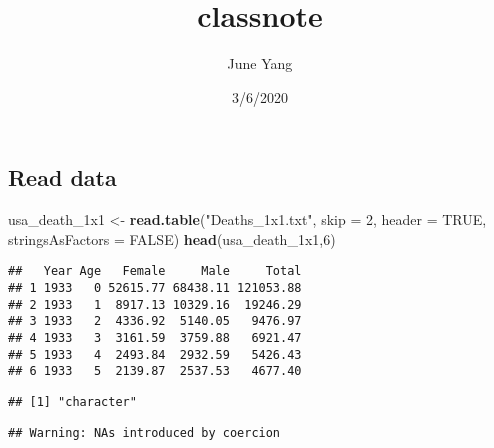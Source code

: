\documentclass[]{article}
\title{classnote}
\author{June Yang}
\date{3/6/2020}
\newenvironment{Shaded}{\begin{snugshade}}{\end{snugshade}}
\newcommand{\DataTypeTok}[1]{\textcolor[rgb]{0.13,0.29,0.53}{#1}}
\newcommand{\DecValTok}[1]{\textcolor[rgb]{0.00,0.00,0.81}{#1}}
\newcommand{\KeywordTok}[1]{\textcolor[rgb]{0.13,0.29,0.53}{\textbf{#1}}}
\newcommand{\NormalTok}[1]{#1}
\newcommand{\OperatorTok}[1]{\textcolor[rgb]{0.81,0.36,0.00}{\textbf{#1}}}
\newcommand{\OtherTok}[1]{\textcolor[rgb]{0.56,0.35,0.01}{#1}}
\newcommand{\StringTok}[1]{\textcolor[rgb]{0.31,0.60,0.02}{#1}}
\begin{document}
\maketitle

{
\hypersetup{linkcolor=black}
\setcounter{tocdepth}{2}
\tableofcontents
}
\hypertarget{read-data}{%
\subsection{Read data}\label{read-data}}

\begin{Shaded}
\begin{Highlighting}[]
\NormalTok{usa_death_1x1 <-}\StringTok{ }\KeywordTok{read.table}\NormalTok{(}\StringTok{"Deaths_1x1.txt"}\NormalTok{, }\DataTypeTok{skip =} \DecValTok{2}\NormalTok{, }\DataTypeTok{header =} \OtherTok{TRUE}\NormalTok{, }\DataTypeTok{stringsAsFactors =} \OtherTok{FALSE}\NormalTok{)}
\KeywordTok{head}\NormalTok{(usa_death_1x1,}\DecValTok{6}\NormalTok{)}
\end{Highlighting}
\end{Shaded}

\begin{verbatim}
##   Year Age   Female     Male     Total
## 1 1933   0 52615.77 68438.11 121053.88
## 2 1933   1  8917.13 10329.16  19246.29
## 3 1933   2  4336.92  5140.05   9476.97
## 4 1933   3  3161.59  3759.88   6921.47
## 5 1933   4  2493.84  2932.59   5426.43
## 6 1933   5  2139.87  2537.53   4677.40
\end{verbatim}

\begin{Shaded}
\end{Shaded}

\begin{verbatim}
## [1] "character"
\end{verbatim}

\begin{Shaded}
\end{Shaded}

\begin{verbatim}
## Warning: NAs introduced by coercion
\end{verbatim}
\end{document}
